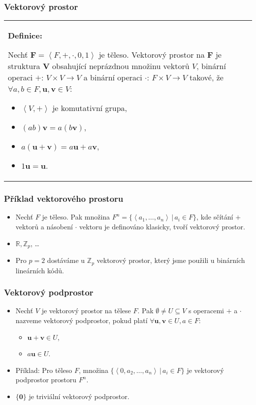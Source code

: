 \documentclass{beamer}
\newenvironment{definice}
{
    \begin{center}
    \begin{tabular}{p{9cm}}
    \textbf{Definice:}
}
{
    \end{tabular}
    \end{center}
}
\newcommand{\sep}{\,|\,}
\newcommand{\F}{\textbf{F}}
\newcommand{\vu}{\textbf{u}}
\newcommand{\vv}{\textbf{v}}
\newenvironment{itemizex}%
  {\large \begin{itemize}%
    \setlength{\itemsep}{8pt}%
    \setlength{\parskip}{8pt}}%
  {\end{itemize}}
\newenvironment{itemize4}%
  {\large \begin{itemize}%
    \setlength{\itemsep}{4pt}%
    \setlength{\parskip}{4pt}}%
  {\end{itemize}}
\begin{document}
\begin{frame}[t,fragile]\frametitle{Vektorový prostor} 
    \begin{definice}
        Nechť $\F=\left<F,+,\cdot,0,1\right>$ je těleso. Vektorový prostor na $\F$ je struktura $\textbf{V}$ obsahující neprázdnou množinu vektorů $V$, binární operaci $+$: $V\times V\rightarrow V$ a binární operaci $\cdot$: $F\times V\rightarrow V$ takové, že $\forall a,b\in F, \vu,\vv\in V$: 

        \begin{itemize4}
            \item $\left<V,+\right>$ je komutativní grupa,
            \item $(ab)\vv=a(b\vv)$,
            \item $a(\vu+\vv)=a\vu+a\vv$,
            \item $1\vu=\vu$.
        \end{itemize4}
    \end{definice}
\end{frame}


\begin{frame}[t,fragile]\frametitle{Příklad vektorového prostoru} 
    \begin{itemizex}
        \item Nechť $F$ je těleso. Pak množina $F^n=\{\left<a_1,\dots,a_n\right>\sep a_i\in F\}$, kde sčítání $+$ vektorů a násobení $\cdot$ vektoru je definováno klasicky, tvoří vektorový prostor.
        \item $\mathbb{R}, \mathbb{Z}_p$, \dots 
        \item Pro $p=2$ dostáváme u $\mathbb{Z}_p$ vektorový prostor, který jsme použili u binárních lineárních kódů.
    \end{itemizex}
\end{frame}


\begin{frame}[t,fragile]\frametitle{Vektorový podprostor} 
    \begin{itemizex}
        \item Nechť $V$ je vektorový prostor na tělese $F$. Pak $\emptyset\ne U\subseteq V$ s operacemi $+$ a $\cdot$ nazveme vektorový podprostor, pokud platí $\forall \vu,\vv\in U, a\in F$:
        \begin{itemize}
            \item $\vu+\vv\in U$,
            \item $a\vu\in U$.
        \end{itemize}

        \item Příklad: Pro těleso $F$, množina $\{\left<0,a_2,\dots,a_n\right>\sep a_i\in F \}$ je vektorový podprostor prostoru $F^n$.
        \item $\{\textbf{0}\}$ je triviální vektorový podprostor.
    \end{itemizex}
\end{frame}
\end{document}

